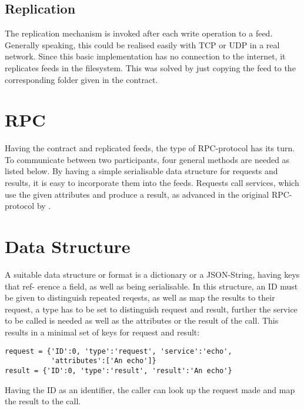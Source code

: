 \subsection{Replication}
The replication mechanism is invoked after each write operation to a feed. Generally speaking, this could be realised easily with TCP or UDP in a real network. Since this basic implementation has no connection to the internet, it replicates feeds in the filesystem. This was solved by just copying the feed to the corresponding folder given in the contract.
\section{RPC}
Having the contract and replicated feeds, the type of RPC-protocol has its turn. To communicate between two participants, four general methods are needed as listed below. By having a simple serialisable data structure for requests and results, it is easy to incorporate them into the feeds. Requests call services, which use the given attributes and produce a result, as advanced in the original RPC-protocol by \citet{birrell1984implementing}.
\section{Data Structure}
A suitable data structure or format is a dictionary or a JSON-String, having keys that ref- erence a field, as well as being serialisable. In this structure, an ID must be given to distinguish repeated reqests, as well as map the results to their request, a type has to be set to distinguish request and result, further the service to be called is needed as well as the attributes or the result of the call. This results in a minimal set of keys for request and result:\\

\begin{lstlisting}
request = {'ID':0, 'type':'request', 'service':'echo', 
           'attributes':['An echo']}
result = {'ID':0, 'type':'result', 'result':'An echo'}
\end{lstlisting}


Having the ID as an identifier, the caller can look up the request made and map the result to the call.
